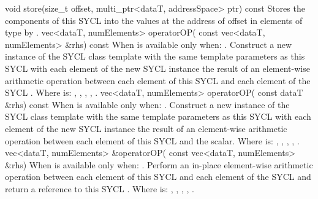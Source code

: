   {void store(size_t offset, multi_ptr<dataT, addressSpace> ptr) const}
  {
    Stores the components of this SYCL  into the values at the address of  offset in elements of type  by .
  }
  \addRowTwoL
  {vec<dataT, numElements> operatorOP(}
  {  const vec<dataT, numElements> \&rhs) const}
  {
    When  is \codeinline{\%} available only when: .
    \newline
    Construct a new instance of the SYCL  class template with the same template parameters as this SYCL  with each element of the new SYCL  instance the result of an element-wise  arithmetic operation between each element of this SYCL  and each element of the  SYCL .
    \newline \newline
    Where  is: \codeinline{+}, \codeinline{-}, \codeinline{*}, \codeinline{/}, \codeinline{\%}.
  }
  \addRowTwoL
  {vec<dataT, numElements> operatorOP(}
  {  const dataT \&rhs) const}
  {
    When  is \codeinline{\%} available only when: .
    \newline
    Construct a new instance of the SYCL  class template with the same template parameters as this SYCL  with each element of the new SYCL  instance the result of an element-wise  arithmetic operation between each element of this SYCL  and the  scalar.
    \newline \newline
    Where  is: \codeinline{+}, \codeinline{-}, \codeinline{*}, \codeinline{/}, \codeinline{\%}.
  }
  \addRowTwoL
  {vec<dataT, numElements> \&operatorOP(}
  {  const vec<dataT, numElements> \&rhs)}
  {
    When  is \codeinline{\%=} available only when: .
    \newline
    Perform an in-place element-wise  arithmetic operation between each element of this SYCL  and each element of the  SYCL  and return a reference to this SYCL .
    \newline \newline
    Where  is: \codeinline{+=}, \codeinline{-=}, \codeinline{*=}, \codeinline{/=}, \codeinline{\%=}.
  }
